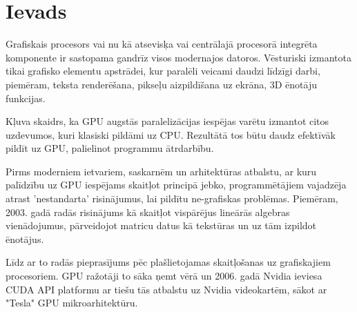 \documentclass[12pt]{report}%
\theoremstyle{definition}
\begin{document}

\printnomenclature

\chapter{Ievads}
Grafiskais procesors vai nu kā atsevisķa vai centrālajā procesorā integrēta komponente ir sastopama
gandrīz visos modernajos datoros. Vēsturiski izmantota tikai grafisko elementu
apstrādei, kur paralēli veicami daudzi līdzīgi darbi, piemēram, teksta renderēšana, pikseļu aizpildīšana uz
ekrāna, 3D ēnotāju funkcijas.

Kļuva skaidrs, ka GPU augstās paralelizācijas iespējas varētu izmantot citos uzdevumos,
kuri klasiski pildāmi uz CPU. Rezultātā tos būtu daudz efektīvāk pildīt uz GPU, palielinot programmu
ātrdarbību.

Pirms moderniem ietvariem, saskarnēm un arhitektūras atbalstu, ar kuru palīdzību uz GPU iespējams skaitļot
principā jebko, programmētājiem vajadzēja atrast 'nestandarta' risinājumus, lai pildītu ne-grafiskas problēmas.
Piemēram, 2003. gadā radās risinājums kā skaitļot vispārējus lineārās algebras vienādojumus,
pārveidojot matricu datus kā tekstūras un uz tām izpildot ēnotājus. \cite{10.1145/882262.882363}

Līdz ar to radās pieprasījums pēc plašlietojamas skaitļošanas uz grafiskajiem procesoriem. GPU ražotāji
to sāka ņemt vērā un 2006. gadā Nvidia ieviesa CUDA API platformu ar tiešu tās atbalstu uz Nvidia 
videokartēm, sākot ar "Tesla" GPU mikroarhitektūru.\cite{nvidia_tesla_p100}
\end{document}
